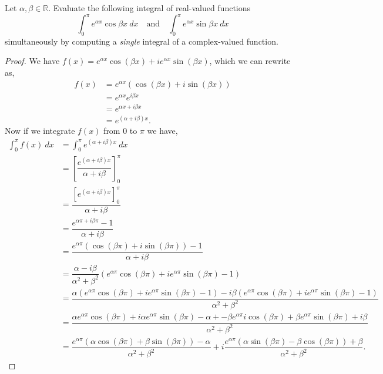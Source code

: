 \documentclass[11pt]{article}
\newenvironment{problem}[2][Problem\!]{\begin{trivlist}
\item[\hskip \labelsep {\bfseries #1}\hskip \labelsep {\bfseries #2}]}{\end{trivlist}}
\newcommand{\rr}{\mathbb R}   %
\newcommand{\lrp}[1]{\left(#1\right)}
\newcommand{\lrb}[1]{\left[#1\right]}
\begin{document}
\newpage  %

\begin{problem}{6.2}
Let $\alpha, \beta \in \rr$. Evaluate the following integral of real-valued functions
\[\int_0^\pi e^{\alpha x}\cos\beta x\ dx \quad \text{and} \quad \int_0^\pi  e^{\alpha x}\sin\beta x\ dx\]
simultaneously by computing a \emph{single} integral of a complex-valued function.
\end{problem}
\begin{proof}
    We have $f(x) = e^{\alpha x}\cos(\beta x) + i e^{\alpha x}\sin(\beta x)$, which we can rewrite as,
    \begin{align*}
        f(x) &= e^{\alpha x}(\cos(\beta x) + i\sin(\beta x)) \\
        &= e^{\alpha x}e^{i \beta x} \\
        &= e^{\alpha x + i\beta x}\\
        & = e^{(\alpha + i\beta) x}.
    \end{align*}
    Now if we integrate $f(x)$ from 0 to $\pi$ we have,
    \begin{align*}
        \int_0^{\pi}f(x)\ dx &= \int_0^{\pi}e^{(\alpha + i \beta)x}\ dx\\ &= \lrb{\dfrac{e^{(\alpha + i\beta )x}}{\alpha + i\beta}}_0^{\pi} \\
        &= \dfrac{\lrb{e^{(\alpha + i \beta)x}}_0^{\pi}}{\alpha + i \beta} \\
        &=\dfrac{e^{\alpha \pi + i\beta \pi} - 1}{\alpha + i \beta} \\
        &= \dfrac{e^{\alpha \pi} (\cos(\beta \pi) + i\sin(\beta \pi)) - 1}{\alpha + i\beta} \\
        &= \dfrac{\alpha - i \beta}{\alpha^{2}+ \beta^{2}}\lrp{e^{\alpha \pi }\cos(\beta \pi) +ie^{\alpha \pi}\sin(\beta\pi) - 1} \\
        &= \dfrac{\alpha\lrp{e^{\alpha \pi }\cos(\beta \pi) +ie^{\alpha \pi}\sin(\beta\pi) - 1} -i\beta\lrp{e^{\alpha \pi }\cos(\beta \pi) +ie^{\alpha \pi}\sin(\beta\pi) - 1}}{\alpha^{2}+ \beta^{2}} \\
        &= \dfrac{\alpha e^{\alpha \pi }\cos(\beta \pi) +i\alpha e^{\alpha \pi}\sin(\beta\pi) - \alpha + -\beta e^{\alpha \pi }i\cos(\beta \pi) +\beta e^{\alpha \pi}\sin(\beta\pi) + i\beta}{\alpha^{2} + \beta^{2}} \\
        &= \dfrac{e^{\alpha \pi}\lrp{\alpha \cos(\beta \pi) +\beta \sin(\beta\pi) }-\alpha}{\alpha^{2}+ \beta^{2}} + i\dfrac{e^{\alpha \pi}\lrp{\alpha \sin(\beta \pi) -\beta\cos(\beta \pi)} + \beta}{\alpha^{2} + \beta^{2}}.

\end{align*}
\end{proof}
\end{document}
